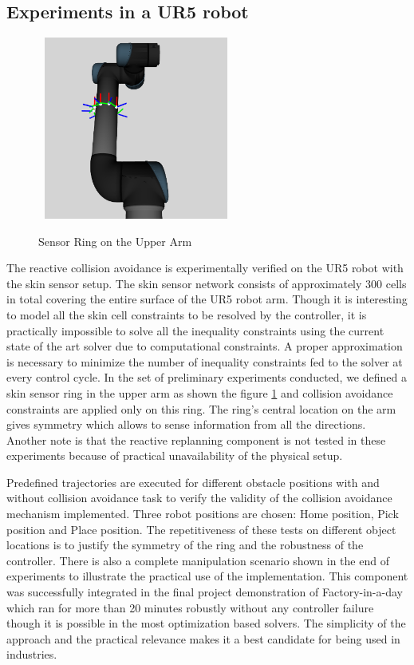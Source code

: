 \subsection{Experiments in a UR5 robot}

\begin{figure}[H]
\centering
{\includegraphics[width=6.5cm,height=6cm]{chapters/doa/images/delft/ring_sensors.png}}
\caption{Sensor Ring on the Upper Arm}
\label{fig:ringsensors}
\end{figure}

The reactive collision avoidance is experimentally verified on the UR5 robot with the skin sensor setup. The skin sensor network  consists of approximately 300 cells in total covering the entire surface of the UR5 robot arm. Though it is interesting to model all the skin cell constraints to be resolved by the controller, it is practically impossible to solve all the inequality constraints using the current state of the art solver due to computational constraints. A proper approximation is necessary to minimize the number of inequality constraints fed to the solver at every control cycle. In the set of preliminary experiments conducted, we defined a skin sensor ring in the upper arm as shown the figure \ref{fig:ringsensors} and collision avoidance constraints are applied only on this ring. The ring's central location on the arm gives symmetry which allows to sense information from all the directions. Another note is that the reactive replanning component is not tested in these experiments because of practical unavailability of the physical setup. 

Predefined trajectories are executed for different obstacle positions with and without collision avoidance task to verify the validity of the collision avoidance mechanism implemented. Three robot positions are chosen: Home position, Pick position and Place position. The repetitiveness of these tests on different object locations is to justify the symmetry of the ring and the robustness of the controller. There is also a complete manipulation scenario shown in the end of experiments to illustrate the practical use of the implementation. This component was successfully integrated in the final project demonstration of Factory-in-a-day which ran for more than 20 minutes robustly without any controller failure though it is possible in the most optimization based solvers. The simplicity of the approach and the practical relevance makes it a best candidate for being used in industries. 

